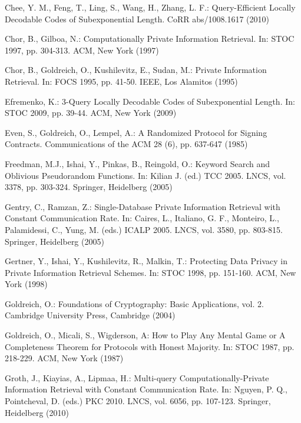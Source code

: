 \documentclass[JMC]{degruyter-journal}
\begin{document}
\begin{thebibliography}{00}
Chee, Y. M., Feng, T., Ling, S., Wang, H.,  Zhang, L. F.:
Query-Efficient Locally Decodable Codes of Subexponential Length.
CoRR abs/1008.1617 (2010)

Chor, B., Gilboa, N.: Computationally Private Information Retrieval.
In: STOC 1997, pp. 304-313. ACM, New York  (1997)


Chor, B., Goldreich, O., Kushilevitz, E., Sudan, M.:
 Private Information Retrieval.
In: FOCS 1995, pp. 41-50. IEEE, Los Alamitos (1995)





Efremenko, K.: 3-Query Locally Decodable Codes of Subexponential
Length. In: STOC 2009, pp. 39-44. ACM, New York  (2009)


Even, S., Goldreich, O., Lempel, A.: A Randomized Protocol for
Signing Contracts. Communications of the ACM 28 (6), pp.  637-647
(1985)

Freedman, M.J., Ishai, Y., Pinkas, B., Reingold, O.: Keyword Search
and Oblivious Pseudorandom Functions. In:  Kilian  J. (ed.) TCC
2005. LNCS, vol. 3378, pp. 303-324.  Springer, Heidelberg (2005)

Gentry, C., Ramzan, Z.: Single-Database Private Information
Retrieval with Constant Communication Rate. In: Caires, L.,
Italiano, G. F.,  Monteiro, L., Palamidessi, C., Yung, M. (eds.)
ICALP 2005. LNCS, vol.  3580,  pp. 803-815. Springer, Heidelberg
(2005)

Gertner, Y., Ishai, Y., Kushilevitz, R., Malkin, T.: Protecting Data
Privacy in Private Information Retrieval Schemes. In:  STOC 1998,
pp. 151-160. ACM, New York (1998)


Goldreich, O.: Foundations of Cryptography: Basic Applications, vol.
2. Cambridge University Press, Cambridge (2004)





Goldreich, O., Micali, S., Wigderson, A: How to Play Any Mental Game
or A Completeness Theorem for Protocols with Honest Majority. In:
STOC 1987, pp. 218-229. ACM, New York (1987)



Groth, J., Kiayias, A., Lipmaa, H.: Multi-query
Computationally-Private Information Retrieval with Constant
Communication Rate. In:  Nguyen, P. Q., Pointcheval, D. (eds.) PKC
2010. LNCS, vol. 6056,  pp. 107-123.   Springer, Heidelberg (2010)



\end{thebibliography}
\end{document}
